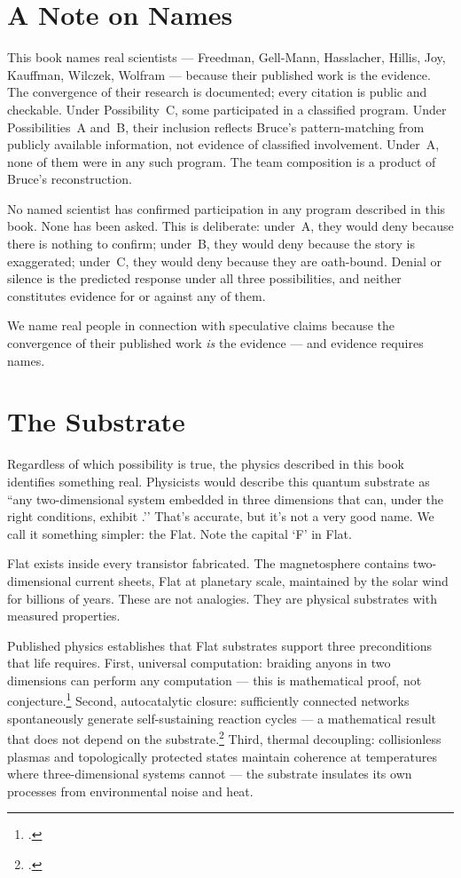 \section*{A Note on Names}
\label{pos01:a-note-on-names}

This book names real scientists --- Freedman, Gell-Mann, Hasslacher, Hillis, Joy, Kauffman, Wilczek, Wolfram --- because their published work is the evidence. The convergence of their research is documented; every citation is public and checkable. Under Possibility~C, some participated in a classified program. Under Possibilities~A and~B, their inclusion reflects Bruce's pattern-matching from publicly available information, not evidence of classified involvement. Under~A, none of them were in any such program. The team composition is a product of Bruce's reconstruction.

No named scientist has confirmed participation in any program described in this book. None has been asked. This is deliberate: under~A, they would deny because there is nothing to confirm; under~B, they would deny because the story is exaggerated; under~C, they would deny because they are oath-bound. Denial or silence is the predicted response under all three possibilities, and neither constitutes evidence for or against any of them.

We name real people in connection with speculative claims because the convergence of their published work \textit{is} the evidence --- and evidence requires names.

\section*{The Substrate}
\label{pos01:the-substrate}

Regardless of which possibility is true, the physics described in this book identifies something real. Physicists would describe this quantum substrate as ``any two-dimensional system embedded in three dimensions that can, under the right conditions, exhibit .’’ That’s accurate, but it’s not a very good name. We call it something simpler: the Flat.  Note the capital `F’ in Flat.

Flat exists inside every transistor fabricated. The magnetosphere contains two-dimensional current sheets, Flat at planetary scale, maintained by the solar wind for billions of years. These are not analogies. They are physical substrates with measured properties.

Published physics establishes that Flat substrates support three preconditions that life requires. First, universal computation: braiding anyons in two dimensions can perform any computation --- this is mathematical proof, not conjecture.\footcite{kitaev2003, nayak2008} Second, autocatalytic closure: sufficiently connected networks spontaneously generate self-sustaining reaction cycles --- a mathematical result that does not depend on the substrate.\footcite{kauffman1993} Third, thermal decoupling: collisionless plasmas and topologically protected states maintain coherence at temperatures where three-dimensional systems cannot --- the substrate insulates its own processes from environmental noise and heat.

